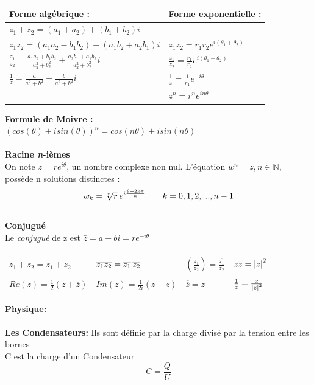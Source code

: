 \documentclass[12pt, letterpaper]{article}
\begin{document}
    \begin{center}
        \begin{tabular}{|l|l|}
        \hline
        Forme algébrique : & Forme exponentielle : \\
        \hline
        $z_1 + z_2 = (a_1 + a_2) + (b_1+b_2)i$ &  \\
        \hline
        \rule{0pt}{1.2em}
        $z_1z_2 = (a_1a_2-b_1b_2) + (a_1b_2+a_2b_1)i$ & $z_1z_2 = r_1r_2e^{i(\theta_1 + \theta_2)}$ \\[2pt]
        \hline
        \rule{0pt}{1.4em}
        $\frac{z_1}{z_2} = \frac{a_1a_2+b_1b_2}{a_2^2+b_2^2} + \frac{a_2b_1+a_1b_2}{a_2^2+b_2^2}i$ & $\frac{z_1}{z_2} = \frac{r_1}{r_2}e^{i(\theta_1-\theta_2)}$\\[2pt]
        \hline
        \rule{0pt}{1.4em}
        $\frac{1}{z} = \frac{a}{a^2+b^2} - \frac{b}{a^2+b^2}i$ & $\frac{1}{z} = \frac{1}{r_1}e^{-i\theta}$\\[2pt]
        \hline
        \rule{0pt}{1.4em}
        & $z^n = r^ne^{in\theta}$\\[2pt]
        \hline
        \end{tabular}
    \end{center}
\textbf{Formule de Moivre :}
\\
$(cos(\theta) + isin(\theta))^n = cos(n\theta) + isin(n\theta)$
\\
\\
\textbf{Racine \textit{n}-ièmes}
\\
On note $z = re^{i\theta}$, un nombre complexe non nul.
L'équation $w^n = z, n \in \mathbb{N}$, possède n solutions distinctes :
\[
w_k = \sqrt[n]{r}\hspace*{0.2em}e^{i\frac{\theta+2k\pi}{n}}\hspace*{2em} k = 0,1,2,...,n-1
\]
\\
\textbf{Conjugué}
\\
Le \textit{conjugué} de z est $\bar{z} = a-bi = re^{-i\theta}$
    \begin{center}
        \begin{tabular}{|l|l|l|l|}
        \hline
        \rule{0pt}{1.8em}
        $\overline{z_1+z_2} = \overline{z_1} + \overline{z_2}$ & $\overline{z_1z_2} = \overline{z_1}\hspace*{0.2em}\overline{z_2}$ & $\overline{\left(\frac{z_1}{z_2}\right)} = \frac{\overline{z_1}}{\overline{z_2}}$ & $z\overline{z} = \abs{z}^2$\\[8pt]
        \hline
        \rule{0pt}{1.4em}
        $Re(z) = \frac{1}{2}(z + \overline{z})$ & $Im(z) = \frac{1}{2i}(z-\overline{z})$ & $\overline{\overline{z}} = z$ & $\frac{1}{z} = \frac{\overline{z}}{\abs{z}^2}$\\[4pt]
        \hline
        \end{tabular}
    \end{center}
\newpage
\hspace*{2em}\textbf{\underline{Physique:}}
\\
\\
\textbf{Les Condensateurs: }
Ils sont définie par la charge divisé par la tension entre les bornes
\\
C est la charge d'un Condensateur
\[
C = \frac{Q}{U}
\]
\end{document}
